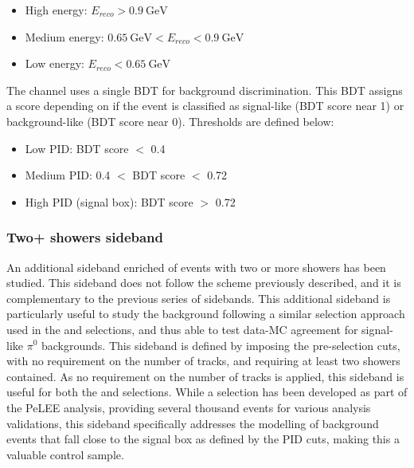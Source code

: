 \begin{itemize}
    \item High energy: $E_{reco} > 0.9 ~\text{GeV}$
    \item Medium energy: $0.65 ~\text{GeV} < E_{reco} < 0.9 ~\text{GeV}$
    \item Low energy: $E_{reco} < 0.65 ~\text{GeV}$
\end{itemize}

The \nueccnopinop channel uses a single BDT for background discrimination. This BDT assigns a score depending on if the event is classified as signal-like (BDT score near 1) or background-like (BDT score near 0). Thresholds are defined below:

\begin{itemize}
    \item Low PID: BDT score $<$ 0.4
    \item Medium PID: 0.4 $<$ BDT score $<$ 0.72
    \item High PID (signal box): BDT score $>$ 0.72
\end{itemize}

\subsubsection{Two+ showers sideband}
An additional sideband enriched of events with two or more showers has been studied.
This sideband does not follow the scheme previously described, and it is complementary to the previous series of sidebands.
This additional sideband is particularly useful to study the \pizero background following a similar selection approach used in the \npsel and \zpsel selections, and thus able to test data-MC agreement for signal-like $\pi^0$ backgrounds.
This sideband is defined by imposing the \nue pre-selection cuts, with no requirement on the number of tracks, and requiring at least two showers contained.
As no requirement on the number of tracks is applied, this sideband is useful for both the \nueccnopinp and \nueccnopinop selections.
While a \pizero selection has been developed as part of the PeLEE analysis, providing several thousand \pizero events for various analysis validations, this sideband specifically addresses the modelling of background events that fall close to the signal box as defined by the PID cuts, making this a valuable control sample.



